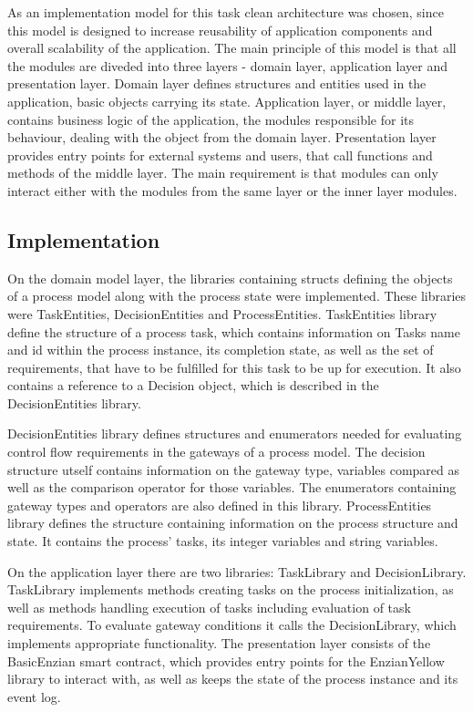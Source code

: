 As an implementation model for this task clean architecture was chosen, since this model is designed to increase reusability of application components and overall scalability of the application. The main principle of this model is that all the modules are diveded into three layers - domain layer, application layer and presentation layer. Domain layer defines structures and entities used in the application, basic objects carrying its state. Application layer, or middle layer, contains business logic of the application, the modules responsible for its behaviour, dealing with the object from the domain layer. Presentation layer provides entry points for external systems and users, that call functions and methods of the middle layer. The main requirement is that modules can only interact either with the modules from the same layer or the inner layer modules.

\subsection{Implementation}
\label{sec:impr:eth:implementation}

On the domain model layer, the libraries containing structs defining the objects of a process model along with the process state were implemented. These libraries were TaskEntities, DecisionEntities and ProcessEntities.\newline
TaskEntities library define the structure of a process task, which contains information on Tasks name and id within the process instance, its completion state, as well as the set of requirements, that have to be fulfilled for this task to be up for execution. It also contains a reference to a Decision object, which is described in the DecisionEntities library.

DecisionEntities library defines structures and enumerators needed for evaluating control flow requirements in the gateways of a process model. The decision structure utself contains information on the gateway type, variables compared as well as the comparison operator for those variables. The enumerators containing gateway types and operators are also defined in this library.\newline
ProcessEntities library defines the structure containing information on the process structure and state. It contains the process' tasks, its integer variables and string variables.

On the application layer there are two libraries: TaskLibrary and DecisionLibrary. TaskLibrary implements methods creating tasks on the process initialization, as well as methods handling execution of tasks including evaluation of task requirements. To evaluate gateway conditions it calls the DecisionLibrary, which implements appropriate functionality.\newline
The presentation layer consists of the BasicEnzian smart contract, which provides entry points for the EnzianYellow library to interact with, as well as keeps the state of the process instance and its event log. 


